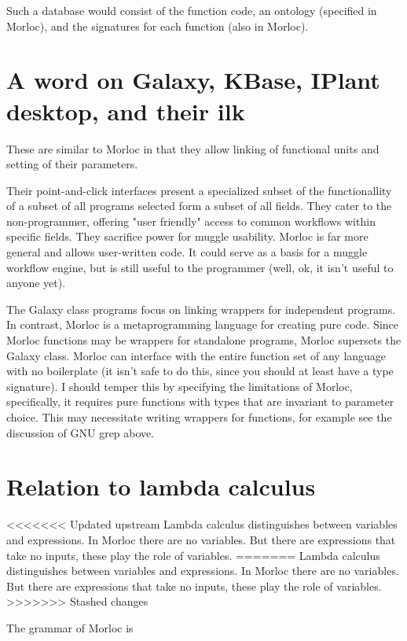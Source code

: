 \documentclass[12pt]{article}
\begin{document}
Such a database would consist of the function code, an ontology (specified in
Morloc), and the signatures for each function (also in Morloc).

\section{A word on Galaxy, KBase, IPlant desktop, and their ilk}

These are similar to Morloc in that they allow linking of functional units and
setting of their parameters.

Their point-and-click interfaces present a specialized subset of the
functionallity of a subset of all programs selected form a subset of all
fields. They cater to the non-programmer, offering "user friendly" access to
common workflows within specific fields. They sacrifice power for muggle
usability. Morloc is far more general and allows user-written code. It could
serve as a basis for a muggle workflow engine, but is still useful to the
programmer (well, ok, it isn't useful to anyone yet).

The Galaxy class programs focus on linking wrappers for independent programs.
In contrast, Morloc is a metaprogramming language for creating pure code. Since
Morloc functions may be wrappers for standalone programs, Morloc supersets the
Galaxy class. Morloc can interface with the entire function set of any language
with no boilerplate (it isn't safe to do this, since you should at least have a
type signature). I should temper this by specifying the limitations of Morloc,
specifically, it requires pure functions with types that are invariant to
parameter choice. This may necessitate writing wrappers for functions, for
example see the discussion of GNU grep above.

\section{Relation to lambda calculus}

<<<<<<< Updated upstream
Lambda calculus distinguishes between variables and expressions. In Morloc there
are no variables. But there are expressions that take no inputs, these play the
role of variables.
=======
Lambda calculus distinguishes between variables and expressions. In Morloc
there are no variables. But there are expressions that take no inputs, these
play the role of variables.
>>>>>>> Stashed changes

The grammar of Morloc is
\end{document}

